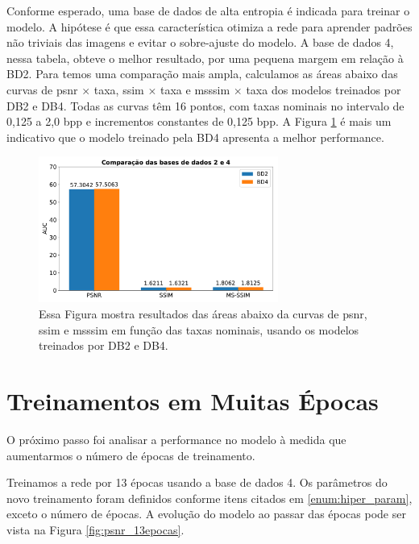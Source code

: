 Conforme esperado, uma base de dados de alta entropia é indicada para treinar o modelo. A hipótese é que essa característica otimiza a rede para aprender padrões não triviais das imagens e evitar o sobre-ajuste do modelo. A base de dados 4, nessa tabela, obteve o melhor resultado, por uma pequena margem em relação à BD2. 
Para temos uma comparação mais ampla, calculamos as áreas abaixo das curvas de \acrshort{psnr} $\times$ taxa, \acrshort{ssim} $\times$ taxa e  \acrshort{msssim} $\times$ taxa dos modelos treinados por DB2 e DB4. Todas  as curvas têm 16 pontos, com taxas nominais no intervalo de 0,125 a 2,0 bpp e incrementos constantes de 0,125 bpp. A Figura \ref{fig:auc1} é mais um indicativo que o modelo treinado pela BD4 apresenta a melhor performance. 
\begin{figure}
	\centering
	\includegraphics[width=0.7\textwidth]{figuras/auc1.pdf}
	\caption[Comparação dos resultados das bases de dados 2 e 4.]{Essa Figura mostra resultados das áreas abaixo da curvas de \acrshort{psnr}, \acrshort{ssim} e \acrshort{msssim} em função das taxas nominais, usando os modelos treinados por DB2 e DB4.}
	\label{fig:auc1}
\end{figure}


\section{Treinamentos em Muitas Épocas}
O próximo passo foi analisar a performance no modelo à medida que aumentarmos o número de épocas de treinamento.


Treinamos a rede por 13 épocas usando a base de dados 4. Os parâmetros do novo treinamento foram definidos conforme itens citados em \ref{enum:hiper_param}, exceto o número de épocas. A evolução do modelo ao passar das épocas pode ser vista na Figura \ref{fig:psnr_13epocas}. 

